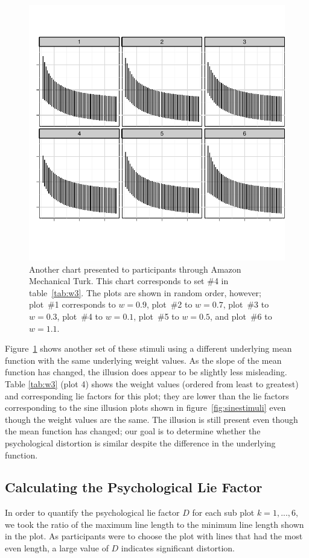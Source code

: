 \documentclass[11pt]{isuthesis}\usepackage[]{graphicx}\usepackage[]{color}
\begin{document}
\begin{figure}[tb]
\centering
\includegraphics[width=.8\linewidth]{fig-stimulicorrectionsize3}
\caption[Sample experimental stimulus]{Another chart presented to participants through Amazon Mechanical Turk. This chart corresponds to set \#4 in table~\ref{tab:w3}. The plots are shown in random order, however; plot~\#1 corresponds to $w=0.9$, plot~\#2 to $w=0.7$, plot~\#3 to $w=0.3$, plot~\#4 to $w=0.1$, plot~\#5 to $w=0.5$, and plot~\#6 to $w=1.1$.}\label{fig:invstimuli}
\end{figure}

Figure~\ref{fig:invstimuli} shows another set of these stimuli using a different underlying mean function with the same underlying weight values. As the slope of the mean function has changed, the illusion does appear to be slightly less misleading. Table \ref{tab:w3} (plot 4) shows the weight values (ordered from least to greatest) and corresponding lie factors for this plot; they are lower than the lie factors corresponding to the sine illusion plots shown in figure~\ref{fig:sinestimuli} even though the weight values are the same. The illusion is still present even though the mean function has changed; our goal is to determine whether the psychological distortion is similar despite the difference in the underlying function.

\subsection{Calculating the Psychological Lie Factor}
In order to quantify the psychological lie factor $D$ for each sub plot $k=1, ..., 6$, we took the ratio of the maximum line length to the minimum line length shown in the plot. As participants were to choose the plot with lines that had the most even length, a large value of $D$ indicates significant distortion. 
\end{document}
